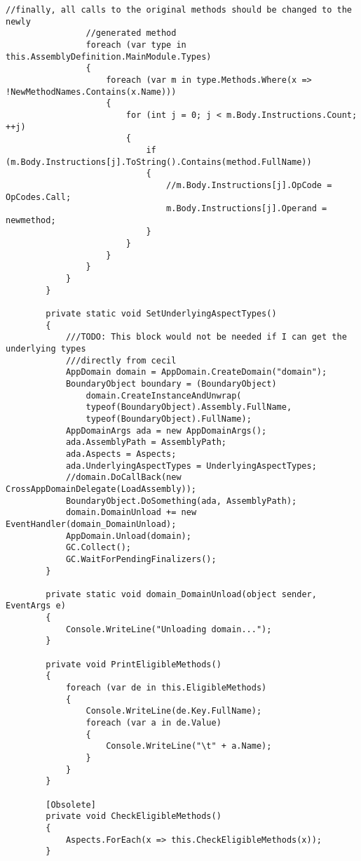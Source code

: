 \begin{lstlisting}[caption={../buffalo/Weaver.cs}, label=../buffalo/Weaver.cs, frame=tb, basicstyle=\scriptsize]
                //finally, all calls to the original methods should be changed to the newly
                //generated method
                foreach (var type in this.AssemblyDefinition.MainModule.Types)
                {
                    foreach (var m in type.Methods.Where(x => !NewMethodNames.Contains(x.Name)))
                    {
                        for (int j = 0; j < m.Body.Instructions.Count; ++j)
                        {
                            if (m.Body.Instructions[j].ToString().Contains(method.FullName))
                            {
                                //m.Body.Instructions[j].OpCode = OpCodes.Call;
                                m.Body.Instructions[j].Operand = newmethod;
                            }
                        }
                    }
                }
            }
        }
        
        private static void SetUnderlyingAspectTypes()
        {
            ///TODO: This block would not be needed if I can get the underlying types
            ///directly from cecil
            AppDomain domain = AppDomain.CreateDomain("domain");
            BoundaryObject boundary = (BoundaryObject)
                domain.CreateInstanceAndUnwrap(
                typeof(BoundaryObject).Assembly.FullName,
                typeof(BoundaryObject).FullName);
            AppDomainArgs ada = new AppDomainArgs();
            ada.AssemblyPath = AssemblyPath;
            ada.Aspects = Aspects;
            ada.UnderlyingAspectTypes = UnderlyingAspectTypes;
            //domain.DoCallBack(new CrossAppDomainDelegate(LoadAssembly));
            BoundaryObject.DoSomething(ada, AssemblyPath);
            domain.DomainUnload += new EventHandler(domain_DomainUnload);
            AppDomain.Unload(domain);
            GC.Collect();
            GC.WaitForPendingFinalizers();
        }

        private static void domain_DomainUnload(object sender, EventArgs e)
        {
            Console.WriteLine("Unloading domain...");
        }

        private void PrintEligibleMethods()
        {
            foreach (var de in this.EligibleMethods)
            {
                Console.WriteLine(de.Key.FullName);
                foreach (var a in de.Value)
                {
                    Console.WriteLine("\t" + a.Name);
                }
            }
        }

        [Obsolete]
        private void CheckEligibleMethods()
        {
            Aspects.ForEach(x => this.CheckEligibleMethods(x));
        }


\end{lstlisting}
